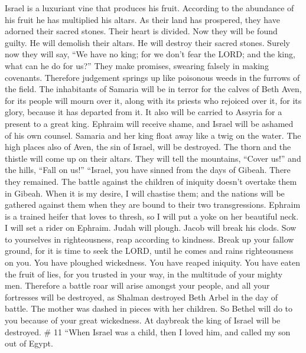  Israel is a luxuriant vine that produces his fruit.
According to the abundance of his fruit he has multiplied his altars. As
their land has prospered, they have adorned their sacred stones.
 Their heart is divided. Now they will be found guilty. He
will demolish their altars. He will destroy their sacred stones.
 Surely now they will say, ``We have no king; for we don't
fear the LORD; and the king, what can he do for us?'' 
They make promises, swearing falsely in making covenants. Therefore
judgement springs up like poisonous weeds in the furrows of the field.
 The inhabitants of Samaria will be in terror for the
calves of Beth Aven, for its people will mourn over it, along with its
priests who rejoiced over it, for its glory, because it has departed
from it.  It also will be carried to Assyria for a present
to a great king. Ephraim will receive shame, and Israel will be ashamed
of his own counsel.  Samaria and her king float away like
a twig on the water.  The high places also of Aven, the
sin of Israel, will be destroyed. The thorn and the thistle will come up
on their altars. They will tell the mountains, ``Cover us!'' and the
hills, ``Fall on us!''  ``Israel, you have sinned from the
days of Gibeah. There they remained. The battle against the children of
iniquity doesn't overtake them in Gibeah.  When it is my
desire, I will chastise them; and the nations will be gathered against
them when they are bound to their two transgressions. 
Ephraim is a trained heifer that loves to thresh, so I will put a yoke
on her beautiful neck. I will set a rider on Ephraim. Judah will plough.
Jacob will break his clods.  Sow to yourselves in
righteousness, reap according to kindness. Break up your fallow ground,
for it is time to seek the LORD, until he comes and rains righteousness
on you.  You have ploughed wickedness. You have reaped
iniquity. You have eaten the fruit of lies, for you trusted in your way,
in the multitude of your mighty men.  Therefore a battle
roar will arise amongst your people, and all your fortresses will be
destroyed, as Shalman destroyed Beth Arbel in the day of battle. The
mother was dashed in pieces with her children.  So Bethel
will do to you because of your great wickedness. At daybreak the king of
Israel will be destroyed. \# 11  ``When Israel was a
child, then I loved him, and called my son out of Egypt. 
